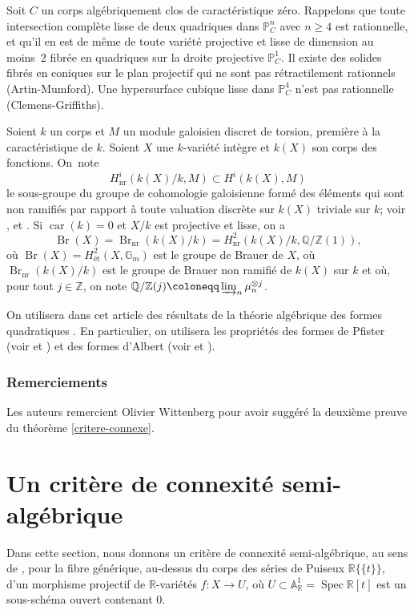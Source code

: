 \documentclass[JEP,XML,SOM,Unicode,francais,published]{cedram}
\theoremstyle{definition}
\newcommand{\Q}{\mathbb Q}
\newcommand{\Z}{\mathbb Z}
\newcommand{\R}{\mathbb R}
\newcommand{\A}{\mathbb A}
\renewcommand{\P}{\mathbb P}
\newcommand{\Spec}{\operatorname{Spec}}
\newcommand{\on}[1]{\operatorname{#1}}
\newcommand{\puiseux}{\mathbb{R}\{\!\{t\}\!\}}
\begin{document}
Soit $C$ un corps algébriquement clos de caractéristique zéro.
Rappelons que toute intersection complète lisse de deux quadriques dans $\P^n_C$ avec $n \geq 4$ est rationnelle,
et qu'il en est de même de toute variété projective et lisse de dimension au moins~2 fibrée en quadriques sur la droite projective $\P^1_C$. Il existe des solides fibrés en coniques sur le plan projectif qui ne sont pas rétractilement rationnels (Artin-Mumford).
Une hypersurface cubique lisse dans $\P^4_C$ n'est pas rationnelle (Clemens-Griffiths).

Soient $k$ un corps et $M$ un module galoisien discret de torsion, première à la caractéristique de $k$.
Soient
$X$ une $k$-variété intègre et $k(X)$
son corps des fonctions. On~note \[
H^{i}_{\on{nr}}(k(X)/k, M) \subset H^{i}(k(X),M)
\]
le sous-groupe du groupe de cohomologie galoisienne
formé des éléments qui sont non ramifiés par rapport à toute valuation discrète sur $k(X)$ triviale sur $k$; voir \hbox{\cite[\S 4]{colliot1995birational}}, \cite{rost1996chow} et \cite{merkurjev2008unramified}.
Si $\on{car}(k)=0$ et $X/k$ est projective et lisse, on a
\[\on{Br}(X)=\on{Br}_{\on{nr}}(k(X)/k)=H^2_{\on{nr}}(k(X)/k,\Q/\Z(1)),\]
où $\on{Br}(X)=H^2_{\text{ét}}(X,\mathbb{G}_m)$ est le groupe de Brauer de $X$, où $\on{Br}_{\on{nr}}(k(X)/k)$ est le groupe de Brauer non ramifié de $k(X)$ sur $k$ et où, pour tout $j\in \Z$, on note $\Q/\Z(j)\coloneqq \varinjlim_n \mu_n^{\otimes j}$.

On utilisera dans cet article des résultats de la théorie algébrique des formes quadratiques \cite{lam2005introduction, kahn2008formes}. En particulier, on utilisera les propriétés des formes de Pfister (voir \cite[Ch.\,X]{lam2005introduction} et \cite[Ch.\,2]{kahn2008formes}) et des formes d'Albert (voir \cite[(4.7) p.\,69, Albert's Th.\,4.8]{lam2005introduction} et \cite[Déf.\,5.7.7, Lem.\,8.1.4]{kahn2008formes}).

\subsubsection*{Remerciements}
Les auteurs remercient Olivier Wittenberg pour avoir suggéré la deuxième preuve du théorème \ref{critere-connexe}.

\section{Un critère de connexité semi-algébrique}\label{ehres}

Dans cette section, nous donnons un critère de connexité semi-algébrique, au sens de \cite[Def.\,2.4.2]{bochnak1998real}, pour la fibre générique, au-dessus du corps des séries de Puiseux $\puiseux$, d'un morphisme projectif de $\R$-variétés $f\colon X\to U$, où $U\subset \A^1_\R=\Spec \R[t]$ est un sous-schéma ouvert contenant $0$.
\end{document}
